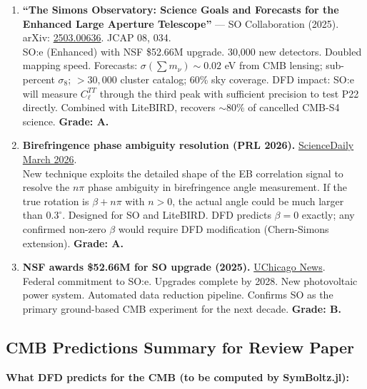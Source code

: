 \documentclass[11pt,a4paper]{article}
\begin{document}
\begin{enumerate}
\item \textbf{``The Simons Observatory: Science Goals and Forecasts for the Enhanced Large Aperture Telescope''} --- SO Collaboration (2025). arXiv: \href{https://arxiv.org/abs/2503.00636}{2503.00636}. JCAP 08, 034.\\
SO:e (Enhanced) with NSF \$52.66M upgrade. 30,000 new detectors. Doubled mapping speed. Forecasts: $\sigma(\sum m_\nu) \sim 0.02$ eV from CMB lensing; sub-percent $\sigma_8$; $> 30{,}000$ cluster catalog; 60\% sky coverage. DFD impact: SO:e will measure $C_\ell^{TT}$ through the third peak with sufficient precision to test P22 directly. Combined with LiteBIRD, recovers $\sim 80\%$ of cancelled CMB-S4 science. \textbf{Grade: A.}

\item \textbf{Birefringence phase ambiguity resolution (PRL 2026).} \href{https://www.sciencedaily.com/releases/2026/03/260315225141.htm}{ScienceDaily March 2026}.\\
New technique exploits the detailed shape of the EB correlation signal to resolve the $n\pi$ phase ambiguity in birefringence angle measurement. If the true rotation is $\beta + n\pi$ with $n > 0$, the actual angle could be much larger than $0.3^\circ$. Designed for SO and LiteBIRD. DFD predicts $\beta = 0$ exactly; any confirmed non-zero $\beta$ would require DFD modification (Chern-Simons extension). \textbf{Grade: A.}

\item \textbf{NSF awards \$52.66M for SO upgrade (2025).} \href{https://news.uchicago.edu/story/nsf-awards-52m-upgrade-simons-observatory-chile-explore-origins-universe}{UChicago News}.\\
Federal commitment to SO:e. Upgrades complete by 2028. New photovoltaic power system. Automated data reduction pipeline. Confirms SO as the primary ground-based CMB experiment for the next decade. \textbf{Grade: B.}
\end{enumerate}

\subsection{CMB Predictions Summary for Review Paper}

\textbf{What DFD predicts for the CMB (to be computed by SymBoltz.jl):}
\end{document}
